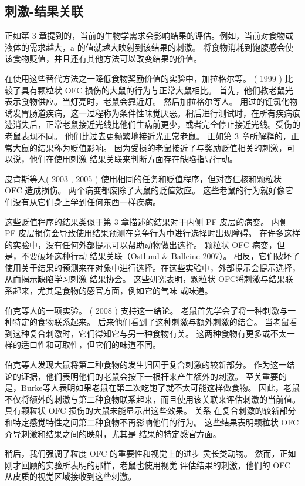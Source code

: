 \subsection{刺激-结果关联}
正如第 3 章提到的，当前的生物学需求会影响结果的评估。例如，当前对食物或液体的需求越大，a 的值就越大映射到该结果的刺激。 将食物消耗到饱腹感会使该食物贬值，并且还有其他方法可以改变结果的价值。\par
在使用这些替代方法之一降低食物奖励价值的实验中，加拉格尔等。 ( 1999 ) 比较了具有颗粒状 OFC 损伤的大鼠的行为与正常大鼠相比。 首先，他们教老鼠光表示食物供应。当灯亮时，老鼠会靠近灯。 然后加拉格尔等人。 用过的锂氯化物诱发胃肠道疾病，这一过程称为条件性味觉厌恶。稍后进行测试时，在所有疾病痕迹消失后，正常老鼠接近光线比他们生病前更少，或者完全停止接近光线。受伤的老鼠表现不同。 他们比过去更频繁地接近光正常老鼠。 正如第 3 章所解释的，正常大鼠的结果称为贬值影响。 因为受损的老鼠接近了与奖励贬值相关的刺激，可以说，他们在使用刺激-结果关联来判断方面存在缺陷指导行动。\par
皮肯斯等人( 2003 , 2005 ) 使用相同的任务和贬值程序，但对杏仁核和颗粒状 OFC 造成损伤。 两个病变都废除了大鼠的贬值效应。 这些老鼠的行为就好像它们没有从它们身上学到任何东西一样疾病。\par
这些贬值程序的结果类似于第 3 章描述的结果对于内侧 PF 皮层的病变。 内侧 PF 皮层损伤会导致使用结果预测在竞争行为中进行选择时出现障碍。 在许多这样的实验中，没有任何外部提示可以帮助动物做出选择。 颗粒状 OFC 病变，但是，不要破坏这种行动-结果关联（Ostlund \& Balleine 2007）。
相反，它们破坏了使用关于结果的预测来在对象中进行选择。在这些实验中，外部提示会提示选择，从而揭示缺陷学习刺激-结果协会。 这些研究表明，颗粒状 OFC将刺激与结果联系起来，尤其是食物的感官方面，例如它的气味
或味道。\par
伯克等人的一项实验。 ( 2008 ) 支持这一结论。 老鼠首先学会了将一种刺激与一种特定的食物联系起来。 后来他们看到了这种刺激与额外刺激的结合。 当老鼠看到这种复合刺激时，它们得知它与另一种食物有关。 这两种食物有更多或不太一样的适口性和可取性，但它们的味道不同。\par
伯克等人发现大鼠将第二种食物的发生归因于复合刺激的较新部分。 作为这一结论的证据，他们表明他们的老鼠会按下一根杆来产生额外的刺激。 至关重要的是，Burke等人表明如果老鼠在第二次吃饱了就不太可能这样做食物。 因此，老鼠不仅将额外的刺激与第二种食物联系起来，而且使用该关联来评估刺激的当前值。具有颗粒状 OFC 损伤的大鼠未能显示出这些效果。 关系
在复合刺激的较新部分和特定感觉特性之间第二种食物不再影响他们的行为。 这些结果表明颗粒状 OFC 介导刺激和结果之间的映射，尤其是
结果的特定感官方面。\par
稍后，我们强调了粒度 OFC 的重要性和视觉上的进步
灵长类动物。 然而，正如刚才回顾的实验所表明的那样，老鼠也使用视觉
评估结果的刺激，他们的 OFC 从皮质的视觉区域接收到这些刺激。\par
